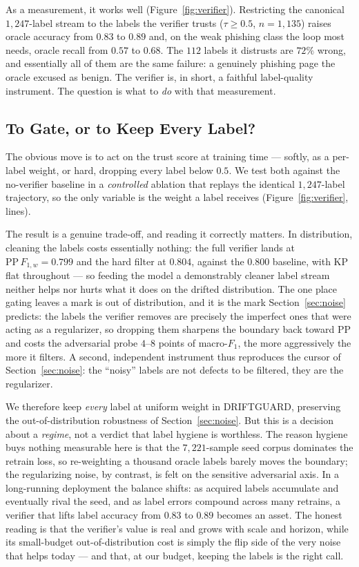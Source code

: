 As a measurement, it works well (Figure~\ref{fig:verifier}). Restricting the
canonical $1{,}247$-label stream to the labels the verifier trusts
($\tau\!\geq\!0.5$, $n{=}1{,}135$) raises oracle accuracy from $0.83$ to $0.89$
and, on the weak phishing class the loop most needs, oracle recall from $0.57$ to
$0.68$. The $112$ labels it distrusts are $72\%$ wrong, and essentially all of
them are the same failure: a genuinely phishing page the oracle excused as
benign. The verifier is, in short, a faithful label-quality instrument. The
question is what to \emph{do} with that measurement.

\subsection{To Gate, or to Keep Every Label?}
\label{ssec:verifier-gate}

The obvious move is to act on the trust score at training time --- softly, as a
per-label weight, or hard, dropping every label below $0.5$. We test both against
the no-verifier baseline in a \emph{controlled} ablation that replays the
identical $1{,}247$-label trajectory, so the only variable is the weight a label
receives (Figure~\ref{fig:verifier}, lines).

The result is a genuine trade-off, and reading it correctly matters. In
distribution, cleaning the labels costs essentially nothing: the full verifier
lands at $\mathrm{PP}\,F_{1,w}=0.799$ and the hard filter at $0.804$, against the
$0.800$ baseline, with KP flat throughout --- so feeding the model a demonstrably
cleaner label stream neither helps nor hurts what it does on the drifted
distribution. The one place gating leaves a mark is out of distribution, and it
is the mark Section~\ref{sec:noise} predicts: the labels the verifier removes are
precisely the imperfect ones that were acting as a regularizer, so dropping them
sharpens the boundary back toward PP and costs the adversarial probe $4$--$8$
points of macro-$F_1$, the more aggressively the more it filters. A second,
independent instrument thus reproduces the cursor of Section~\ref{sec:noise}: the
``noisy'' labels are not defects to be filtered, they are the regularizer.

We therefore keep \emph{every} label at uniform weight in DRIFTGUARD, preserving
the out-of-distribution robustness of Section~\ref{sec:noise}. But this is a
decision about a \emph{regime}, not a verdict that label hygiene is worthless.
The reason hygiene buys nothing measurable here is that the $7{,}221$-sample seed
corpus dominates the retrain loss, so re-weighting a thousand oracle labels
barely moves the boundary; the regularizing noise, by contrast, is felt on the
sensitive adversarial axis. In a long-running deployment the balance shifts: as
acquired labels accumulate and eventually rival the seed, and as label errors
compound across many retrains, a verifier that lifts label accuracy from $0.83$
to $0.89$ becomes an asset. The honest reading
is that the verifier's value is real and grows with scale and horizon, while its
small-budget out-of-distribution cost is simply the flip side of the very noise
that helps today --- and that, at our budget, keeping the labels is the right call.

